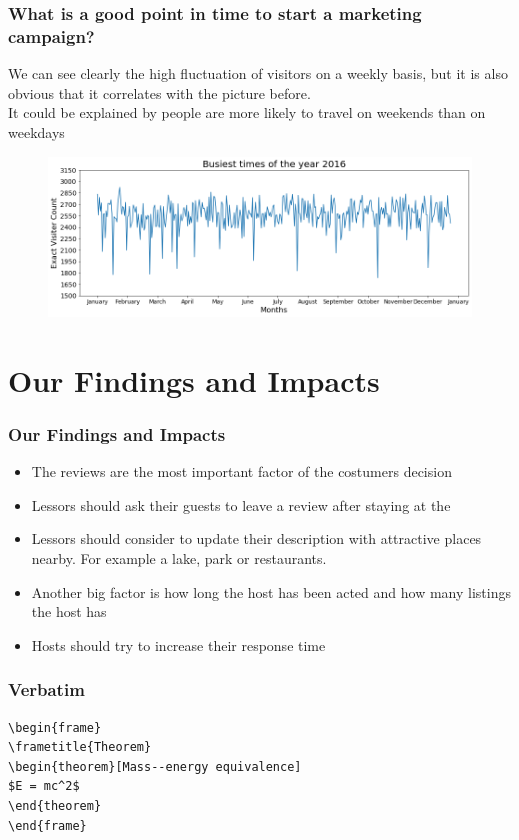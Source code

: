 \documentclass{beamer}
\begin{document}
\begin{frame}
\frametitle{What is a good point in time to start a marketing campaign?}
We can see clearly the high fluctuation of visitors on a weekly basis, but it is also obvious that it correlates with the picture before.\\It could be explained by people are more likely to travel on weekends than on weekdays
\begin{figure}
\includegraphics[width=0.8\linewidth]{photo/5_busiest_times_2016}
\end{figure}
\end{frame}
\section{Our Findings and Impacts}
\begin{frame}
\frametitle{Our Findings and Impacts}
\begin{itemize}
\item The reviews are the most important factor of the costumers decision
\item Lessors should ask their guests to leave a review after staying at the 
\item Lessors should consider to update their description with attractive places nearby. For example a lake, park or restaurants.
\item Another big factor is how long the host has been acted and how many listings the host has
\item Hosts should try to increase their response time
\end{itemize}

\end{frame}



\begin{frame}[fragile] %
\frametitle{Verbatim}
\begin{example}
\begin{verbatim}
\begin{frame}
\frametitle{Theorem}
\begin{theorem}[Mass--energy equivalence]
$E = mc^2$
\end{theorem}
\end{frame}\end{verbatim}
\end{example}
\end{frame}
\end{document}
